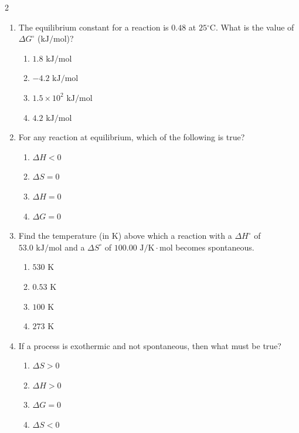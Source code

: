 \documentclass[12pt,letterpaper]{article}
\begin{document}
\begin{multicols*}{2}
\begin{enumerate}
        \item The equilibrium constant for a reaction is $0.48$ at $25\text{}^\circ\text{C}$. What is the value of $\Delta G^\circ$ ($\text{kJ/mol}$)? %
            \begin{enumerate}
                \item $1.8\text{ kJ/mol}$
                \item $-4.2\text{ kJ/mol}$
                \item $1.5 \times 10^2\text{ kJ/mol}$
                \item $4.2\text{ kJ/mol}$
            \end{enumerate}
        \columnbreak
        \item For any reaction at equilibrium, which of the following is true? %
            \begin{enumerate}
                \item $\Delta H < 0$
                \item $\Delta S = 0$
                \item $\Delta H = 0$
                \item $\Delta G = 0$
            \end{enumerate}

        \item Find the temperature (in $\text{K}$) above which a reaction with a $\Delta H^\circ$ of $53.0\text{ kJ/mol}$ and a $\Delta S^\circ$ of $100.00\text{ J/K}\cdot\text{mol}$ becomes spontaneous. %
            \begin{enumerate}
                \item $530\text{ K}$
                \item $0.53\text{ K}$
                \item $100\text{ K}$
                \item $273\text{ K}$
            \end{enumerate}

        \item If a process is exothermic and not spontaneous, then what must be true? %
            \begin{enumerate}
                \item $\Delta S > 0$
                \item $\Delta H > 0$
                \item $\Delta G = 0$
                \item $\Delta S < 0$
            \end{enumerate}


\end{enumerate}
\end{multicols*}
\end{document}
